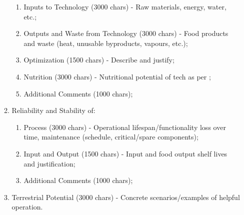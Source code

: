 \documentclass{report}
\begin{document}
\begin{appendices}
\begin{enumerate}
\begin{enumerate}
\begin{enumerate}
            \item Inputs to Technology (3000 chars) - Raw materials, energy, water, etc.;
            \item Outputs and Waste from Technology (3000 chars) - Food products and waste (heat, unusable byproducts, vapours, etc.);
            \item Optimization (1500 chars) - Describe and justify;
            \item Nutrition (3000 chars) - Nutritional potential of tech as per \cite{nutrition};
            \item Additional Comments (1000 chars);
        \end{enumerate}
        \item Reliability and Stability of:
        \begin{enumerate}
            \item Process (3000 chars) - Operational lifespan/functionality loss over time, maintenance (schedule, critical/spare components);
            \item Input and Output (1500 chars) - Input and food output shelf lives and justification;
            \item Additional Comments (1000 chars);
        \end{enumerate}
        \item Terrestrial Potential (3000 chars) - Concrete scenarios/examples of helpful operation.
    \end{enumerate}
\end{enumerate}

\end{appendices}
\newpage



\end{document}
